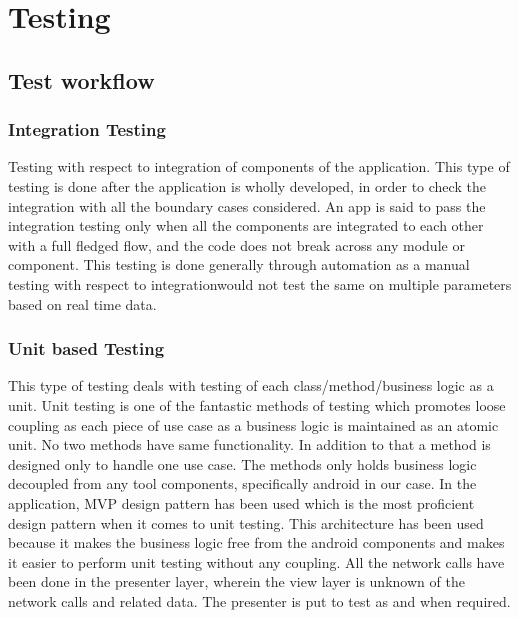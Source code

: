 \documentclass[oneside,12pt]{Classes/VTU}
\begin{document}
	
	\chapter{Testing}
	
	\section{Test workflow}
	\subsection{Integration Testing}
	Testing with respect to integration of components of the application. This type of testing is done after the application is wholly developed, in order to check the integration with all the boundary cases considered. An app is said to pass the integration testing only when all the components are integrated to each other with a full fledged flow, and the code does not break across any module or component. This testing is done generally through automation as a manual testing with respect to integrationwould not test the same on multiple parameters based on real time data.

	\subsection{Unit based Testing}
	This type of testing deals with testing of each class/method/business logic as a unit. Unit testing is one of the fantastic methods of testing which promotes loose coupling as each piece of use case as a business logic is maintained as an atomic unit. No two methods have same functionality. In addition to that a method is designed only to handle one use case. The methods only holds business logic decoupled from any tool components, specifically android in our case. In the application, MVP design pattern has been used which is the most proficient design pattern when it comes to unit testing. This architecture has been used because it makes the business logic free from the android components and makes it easier to perform unit testing without any coupling. All the network calls have been done in the presenter layer, wherein the view layer is unknown of the network calls and related data. The presenter is put to test as and when required.
	
\end{document}
